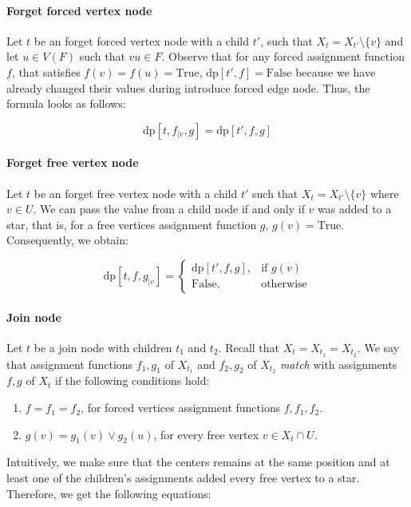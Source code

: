 \documentclass[en]{pracamgr}
\theoremstyle{definition}
\newcommand{\dpt}[1]{\textrm{dp}[#1]}
\newcommand{\true}{\textrm{True}}
\newcommand{\false}{\textrm{False}}
\begin{document}
\paragraph{Forget forced vertex node} Let $t$ be an forget forced vertex node with a child $t'$, such that $X_t = X_{t'} \setminus \{v\}$ and let $u \in V(F)$ such that $vu \in F$. Observe that for any forced assignment function $f$, that satisfies $f(v)=f(u)=\true$, $\dpt{t',f} = \false$ because we have already changed their values during introduce forced edge node. Thus, the formula looks as follows:

\begin{equation*}
	\dpt{t,f_{|v},g} = \dpt{t',f,g}
\end{equation*}

\paragraph{Forget free vertex node} Let $t$ be an forget free vertex node with a child $t'$ such that $X_t = X_{t'} \setminus \{v\}$ where $v \in U$. We can pass the value from a child node if and only if $v$ was added to a star, that is, for a free vertices assignment function $g$, $g(v)=\true$. Consequently, we obtain:

\begin{equation*}
	\dpt{t,f,g_{|v}} =
	\begin{cases}
		\dpt{t',f,g}, & \text{if $g(v)$} \\
		\false, & \text{otherwise}
	\end{cases}
\end{equation*}

\paragraph{Join node} Let $t$ be a join node with children $t_1$ and $t_2$. Recall that $X_t=X_{t_1}=X_{t_2}$. We say that assignment functions $f_1,g_1$ of $X_{t_1}$ and $f_2,g_2$ of $X_{t_2}$ \textit{match} with assignments $f,g$ of $X_t$ if the following conditions hold:

\begin{enumerate}
	\item $f=f_1=f_2$, for forced vertices assignment functions $f,f_1,f_2$.
	\item $g(v)=g_1(v) \lor g_2(u)$, for every free vertex $v \in X_t \cap U$.
\end{enumerate}
Intuitively, we make sure that the centers remains at the same position and at least one of the children's assignments added every free vertex to a star. Therefore, we get the following equations:
\end{document}
